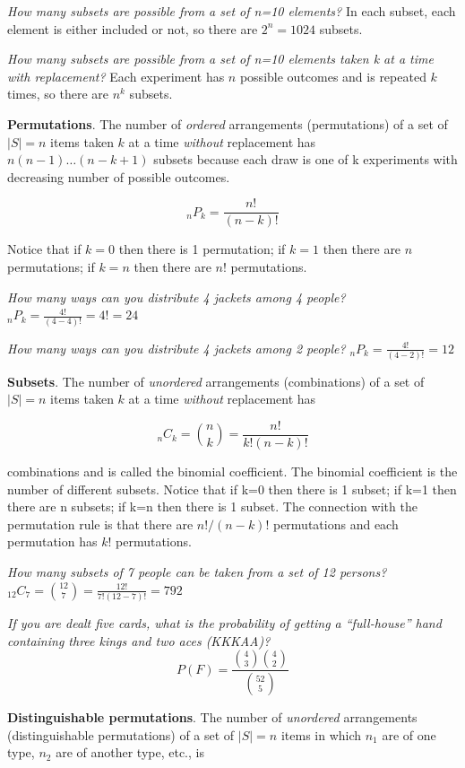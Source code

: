 \documentclass[
]{book}
\begin{document}
\emph{How many subsets are possible from a set of n=10 elements?}
In each subset, each element is either included or not, so there are \(2^n = 1024\) subsets.

\emph{How many subsets are possible from a set of n=10 elements taken k at a time with replacement?}
Each experiment has \(n\) possible outcomes and is repeated \(k\) times, so there are \(n^k\) subsets.

\textbf{Permutations}. The number of \emph{ordered} arrangements (permutations) of a set of \(|S|=n\) items taken \(k\) at a time \emph{without} replacement has \(n(n-1) \dots (n-k+1)\) subsets because each draw is one of k experiments with decreasing number of possible outcomes.

\[_nP_k = \frac{n!}{(n-k)!}\]

Notice that if \(k=0\) then there is 1 permutation; if \(k=1\) then there are \(n\) permutations; if \(k=n\) then there are \(n!\) permutations.

\emph{How many ways can you distribute 4 jackets among 4 people?}
\(_nP_k = \frac{4!}{(4-4)!} = 4! = 24\)

\emph{How many ways can you distribute 4 jackets among 2 people?}
\(_nP_k = \frac{4!}{(4-2)!} = 12\)

\textbf{Subsets}. The number of \emph{unordered} arrangements (combinations) of a set of \(|S|=n\) items taken \(k\) at a time \emph{without} replacement has

\[_nC_k = {n \choose k} = \frac{n!}{k!(n-k)!}\]

combinations and is called the binomial coefficient. The binomial coefficient is the number of different subsets. Notice that if k=0 then there is 1 subset; if k=1 then there are n subsets; if k=n then there is 1 subset. The connection with the permutation rule is that there are \(n!/(n-k)!\) permutations and each permutation has \(k!\) permutations.

\emph{How many subsets of 7 people can be taken from a set of 12 persons?}
\(_{12}C_7 = {12 \choose 7} = \frac{12!}{7!(12-7)!} = 792\)

\emph{If you are dealt five cards, what is the probability of getting a ``full-house'' hand containing three kings and two aces (KKKAA)?}
\[P(F) = \frac{{4 \choose 3} {4 \choose 2}}{{52 \choose 5}}\]

\textbf{Distinguishable permutations}. The number of \emph{unordered} arrangements (distinguishable permutations) of a set of \(|S|=n\) items in which \(n_1\) are of one type, \(n_2\) are of another type, etc., is
\end{document}
